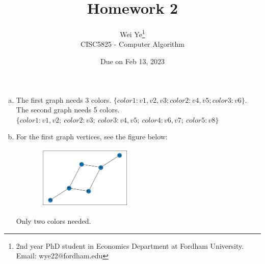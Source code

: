 \documentclass[11pt]{article} %
\title{Homework 2}
\author{Wei Ye\footnote{2nd year PhD student in Economics Department at Fordham University. Email: wye22@fordham.edu}
    \\ CISC5825 - Computer Algorithm}
\date{Due on Feb 13, 2023}
\begin{document}
\maketitle

\begin{enumerate}[(a)]
    \item The first graph needs 3 colors. $\{color1: v1, v2, v3; color2: v4, v5; color3: v6 \}$. The second graph needs 5 colors. $\{color1: v1, v2;\  color2: v3;\  color3: v4, v5; \ color4: v6, v7;\  color5: v8\}$
    \item For the first graph vertices, see the figure below:
    \begin{figure}[h]
        \includegraphics*[width = 5cm, height = 3cm]{b1.png}
        \centering
    \end{figure}
    Only two colors needed.


\end{enumerate}
\end{document}
